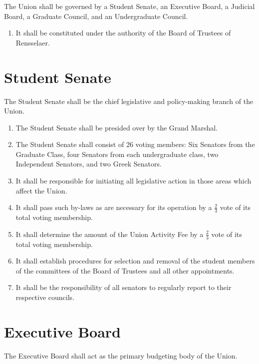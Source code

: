 The Union shall be governed by a Student Senate, an Executive Board, a Judicial Board, a Graduate
Council, and an Undergraduate Council.
\begin{enumerate}
\item It shall be constituted under the authority of the Board of Trustees of Rensselaer.
\end{enumerate}


\section{Student Senate}

The Student Senate shall be the chief legislative and policy-making branch of the Union.

\begin{enumerate}
\item The Student Senate shall be presided over by the Grand Marshal.
\item The Student Senate shall consist of 26 voting members: Six Senators from the Graduate Class, four Senators from each undergraduate class, two Independent Senators, and two Greek Senators.
\item It shall be responsible for initiating all legislative action in those areas which affect the Union.
\item It shall pass such by-laws as are necessary for its operation by a $\frac{2}{3}$ vote of its total voting membership.
\item It shall determine the amount of the Union Activity Fee by a $\frac{2}{3}$ vote of its total voting membership.
\item It shall establish procedures for selection and removal of the student members of the committees of the Board of Trustees and all other appointments.
\item It shall be the responsibility of all senators to regularly report to their respective councils.
\end{enumerate}

\section{Executive Board}

The Executive Board shall act as the primary budgeting body of the Union.

